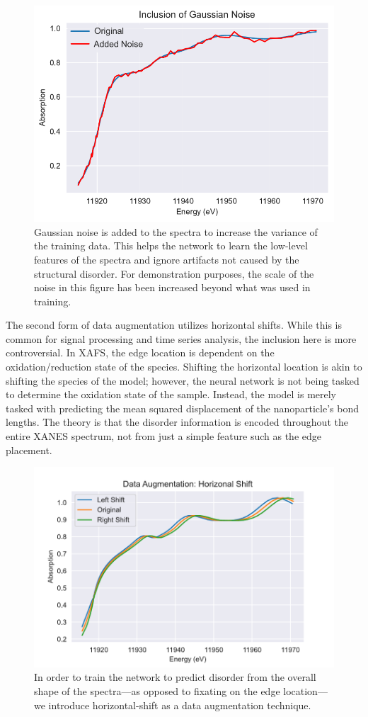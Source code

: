 \begin{figure}[h!]
    \centering
    \includegraphics[width=.75\linewidth]{Chapters/Figures/gaussian-noise-data-aug.pdf}
    \caption[Data Augmentation: Gaussian Noise]{Gaussian noise is added to the spectra to increase the variance of the training data. This helps the network to learn the low-level features of the spectra and ignore artifacts not caused by the structural disorder. For demonstration purposes, the scale of the noise in this figure has been increased beyond what was used in training.}
    \label{fig:data-aug-gauss-noise}
\end{figure}

The second form of data augmentation utilizes horizontal shifts. While this is common for signal processing and time series analysis, the inclusion here is more controversial. In XAFS, the edge location is dependent on the oxidation/reduction state of the species. Shifting the horizontal location is akin to shifting the species of the model; however, the neural network is not being tasked to determine the oxidation state of the sample. Instead, the model is merely tasked with predicting the mean squared displacement of the nanoparticle's bond lengths. The theory is that the disorder information is encoded throughout the entire XANES spectrum, not from just a simple feature such as the edge placement.  

\begin{figure}[h!]
    \centering
    \includegraphics[width=.75\linewidth]{Chapters/Figures/horz-shift-3way.pdf}
    \caption[Data Augmentation: Horizontal Shift]{In order to train the network to predict disorder from the overall shape of the spectra---as opposed to fixating on the edge location---we introduce horizontal-shift as a data augmentation technique.}
    \label{fig:data-aug-hor}
\end{figure}


